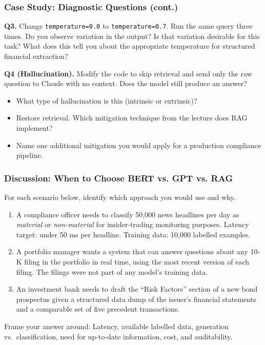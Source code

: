 \documentclass[9pt,t]{beamer}
\begin{document}
\begin{frame}
\frametitle{Case Study: Diagnostic Questions (cont.)}

\textbf{Q3.} Change \texttt{temperature=0.0} to \texttt{temperature=0.7}. Run the
same query three times. Do you observe variation in the output? Is that variation
desirable for this task? What does this tell you about the appropriate temperature
for structured financial extraction?

\medskip
\textbf{Q4 (Hallucination).} Modify the code to skip retrieval and send only the raw
question to Claude with no context. Does the model still produce an answer?
\begin{itemize}
  \item What type of hallucination is this (intrinsic or extrinsic)?
  \item Restore retrieval. Which mitigation technique from the lecture does RAG implement?
  \item Name one additional mitigation you would apply for a production compliance pipeline.
\end{itemize}
\end{frame}

\begin{frame}
\frametitle{Discussion: When to Choose BERT vs. GPT vs. RAG}

For each scenario below, identify which approach you would use and why.

\medskip
\begin{enumerate}
  \item A compliance officer needs to classify 50,000 news headlines per day as
        \emph{material} or \emph{non-material} for insider-trading monitoring purposes.
        Latency target: under 50 ms per headline. Training data: 10,000 labelled examples.

  \item A portfolio manager wants a system that can answer questions about any 10-K
        filing in the portfolio in real time, using the most recent version of each filing.
        The filings were not part of any model's training data.

  \item An investment bank needs to draft the ``Risk Factors'' section of a new bond
        prospectus given a structured data dump of the issuer's financial statements and
        a comparable set of five precedent transactions.
\end{enumerate}

\medskip
\begin{block}{Frame your answer around:}
Latency, available labelled data, generation vs.\ classification, need for up-to-date
information, cost, and auditability.
\end{block}
\end{frame}
\end{document}
